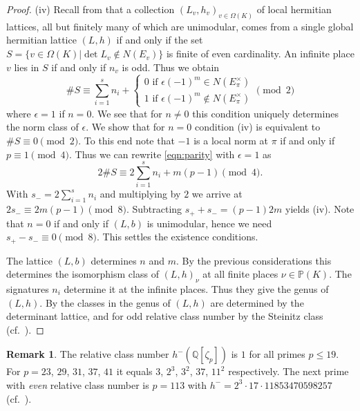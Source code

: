 \documentclass{amsart}
\theoremstyle{definition}
\newtheorem{remark}[definition]{Remark}
\theoremstyle{plain}
\newcommand{\QQ}{\mathbb{Q}}
\begin{document}
\begin{proof}
(iv) Recall from 
that a collection $(L_{v},h_v)_{v\in \Omega(K)}$ of local
hermitian lattices, all but finitely many of which are
unimodular, comes from a single global hermitian lattice
$(L,h)$ if and only if the set
$S=\{v \in \Omega(K) | \det L_v \not \in N(E_v) \}$
is finite of even cardinality.
An infinite place $v$ lies in $S$ if and only if $n_v$ is odd.
Thus we obtain
\begin{equation}\label{eqn:parity}
\# S \equiv \sum_{i=1}^s n_i +
\begin{cases}
0 \mbox{ if } \epsilon (-1)^m \in N(E^\times_\pi)\\
1 \mbox{ if } \epsilon (-1)^m \not\in N(E^\times_\pi)
\end{cases} \pmod{2}
\end{equation}
where $\epsilon = 1$ if $n=0$.
We see that for $n\neq 0$ this condition uniquely determines
the norm class of $\epsilon$.
We show that for $n=0$ condition (iv)
is equivalent to $\#S \equiv 0 \pmod{2}$.
To this end note that $-1$ is a local norm at $\pi$
if and only if $p \equiv 1 \pmod{4}$.
Thus we can rewrite \cref{eqn:parity} with $\epsilon =1$ as
\[2 \#S \equiv 2 \sum_{i=1}^s n_i + m(p-1) \pmod{4}.\]
With $s_- = 2 \sum_{i=1}^s n_i$ and multiplying by $2$ we arrive at $2s_- \equiv 2m(p-1) \pmod{8}$. Subtracting $s_+ + s_- = (p-1)2m$ yields (iv).
Note that $n=0$ if and only if $(L,b)$ is unimodular, hence we need $s_+ - s_- \equiv 0 \pmod{8}$.
This settles the existence conditions.

The lattice $(L,b)$ determines $n$ and $m$. By the previous
considerations this determines the isomorphism class of $(L,h)_\nu$
at all finite places $\nu \in \mathbb{P}(K)$.
The signatures $n_i$ determine it at the infinite places.
Thus they give the genus of $(L,h)$.
By 
the classes in the genus of $(L,h)$ are determined by the determinant lattice, and
 for odd relative class number by the Steinitz class (cf.\  ).\end{proof}

\begin{remark} \label{rmk: relative class numbers}
 The relative class number $h^{-}(\QQ[\zeta_p])$
 is $1$ for all primes $p\leq 19$. For $p=23$, $29$, $31$,
 $37$, $41$ it equals $3$,
 $2^3$,
 $3^2$,
 $37$,
 $11^2$ respectively. The next prime with \emph{even} relative class number is $p=113$ with  $h^-=2^3 \cdot 17 \cdot 11853470598257$ (cf.\ \cite[Tables \S 3]{washington:cyclotomic_fields}).
 \end{remark}
\end{document}
